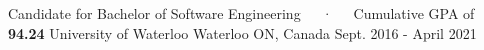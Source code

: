 
\begin{cventries}

  \cventry
    {Candidate for Bachelor of Software Engineering~~~·~~~Cumulative GPA of \textbf{94.24}} %
    {University of Waterloo} %
    {Waterloo ON, Canada} %
    {Sept. 2016 - April 2021} %
    {
      \begin{cvitems} %
      \end{cvitems}
    }

\end{cventries}
